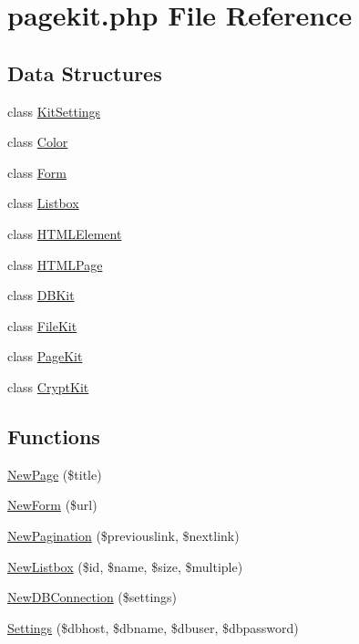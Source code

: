 \hypertarget{pagekit_8php}{\section{pagekit.\-php File Reference}
\label{pagekit_8php}
}
\subsection*{Data Structures}
\begin{DoxyCompactItemize}
\item 
class \hyperlink{class_kit_settings}{Kit\-Settings}
\item 
class \hyperlink{class_color}{Color}
\item 
class \hyperlink{class_form}{Form}
\item 
class \hyperlink{class_listbox}{Listbox}
\item 
class \hyperlink{class_h_t_m_l_element}{H\-T\-M\-L\-Element}
\item 
class \hyperlink{class_h_t_m_l_page}{H\-T\-M\-L\-Page}
\item 
class \hyperlink{class_d_b_kit}{D\-B\-Kit}
\item 
class \hyperlink{class_file_kit}{File\-Kit}
\item 
class \hyperlink{class_page_kit}{Page\-Kit}
\item 
class \hyperlink{class_crypt_kit}{Crypt\-Kit}
\end{DoxyCompactItemize}
\subsection*{Functions}
\begin{DoxyCompactItemize}
\item 
\hyperlink{pagekit_8php_a16321ea290dabb36fceb18b44b356f81}{New\-Page} (\$title)
\item 
\hyperlink{pagekit_8php_abca823657bac21df9c14205c20cdd5bc}{New\-Form} (\$url)
\item 
\hyperlink{pagekit_8php_a859c2080642eca8f7b25efb5d8c4c523}{New\-Pagination} (\$previouslink, \$nextlink)
\item 
\hyperlink{pagekit_8php_a929d2a689ef203a7ef4f395fd29f53f2}{New\-Listbox} (\$id, \$name, \$size, \$multiple)
\item 
\hyperlink{pagekit_8php_a623ca09e2350244859902c7ced32a3b9}{New\-D\-B\-Connection} (\$settings)
\item 
\hyperlink{pagekit_8php_a8fc4d35b2a0ead87b02c2ac7a024a16a}{Settings} (\$dbhost, \$dbname, \$dbuser, \$dbpassword)
\end{DoxyCompactItemize}
